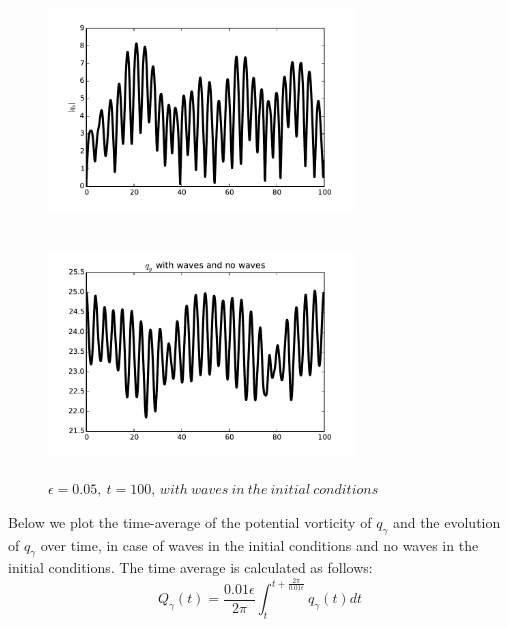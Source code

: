 \documentclass[12pt,twoside]{article}
\begin{document}
\begin{figure}[ht]
\begin{minipage}[b]{0.45\linewidth}
\includegraphics[width=3.2in,height=2.5in]{qb_wave.pdf}
\caption{$q_\beta$}

\includegraphics[width=3.2in,height=2.5in]{qg_wave.pdf}
\caption{$q_\gamma$}

\caption{$\epsilon=0.05 ,\  t=100$, $with\ waves \ in\ the\ initial\ conditions$}


\end{minipage}
\end{figure}
\clearpage
Below we plot the time-average of the potential vorticity of $q_\gamma$ and the evolution of $q_\gamma$ over time, in case of waves in the initial conditions and no waves in the initial conditions. The time average is calculated as follows:
\begin{equation}
Q_\gamma(t)=\frac{0.01 \epsilon}{2 \pi} \int_{t}^{t + \frac{2 \pi}{0.01 \epsilon}}q_\gamma(t) dt
\end{equation}
\end{document}
